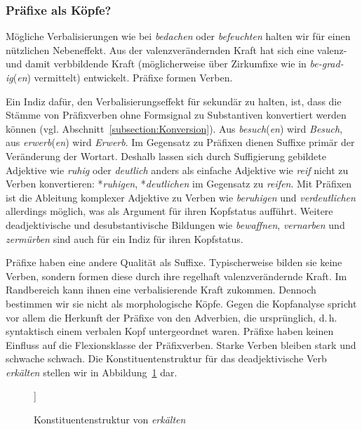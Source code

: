 \subsubsection{Präfixe als Köpfe?}\label{subsubsection:Präfix_Kopf}

Mögliche Verbalisierungen wie bei \textit{bedachen} oder \textit{befeuchten} halten wir für einen nützlichen Nebeneffekt. Aus der valenzverändernden Kraft hat sich eine valenz- und damit verbbildende Kraft (möglicherweise über Zirkumfixe wie in \textit{be-grad-ig}(\textit{en}) vermittelt) entwickelt. Präfixe formen Verben.

Ein Indiz dafür, den Verbalisierungseffekt für sekundär zu halten, ist, dass die Stämme von Präfixverben ohne Formsignal zu Substantiven konvertiert werden können (vgl. Abschnitt~\ref{subsection:Konversion}). Aus \textit{besuch}(\textit{en}) wird \textit{Besuch}, aus \textit{erwerb}(\textit{en}) wird \textit{Erwerb}. Im Gegensatz zu Präfixen dienen Suffixe primär der Veränderung der Wortart. Deshalb lassen sich durch Suffigierung gebildete Adjektive wie \textit{ruhig} oder \textit{deutlich} anders als einfache Adjektive wie \textit{reif} nicht zu Verben konvertieren: *\textit{ruhigen}, *\textit{deutlichen} im Gegensatz zu \textit{reifen}. Mit Präfixen ist die Ableitung komplexer Adjektive zu Verben wie \textit{beruhigen} und \textit{verdeutlichen} allerdings möglich, was \citet[309]{Eisenberg2020_Wort} als Argument für ihren Kopfstatus aufführt. Weitere deadjektivische und desubstantivische Bildungen wie \textit{bewaffnen}, \textit{vernarben} und \textit{zermürben} sind auch für \citet[80--84]{Olsen1985} ein Indiz für ihren Kopfstatus. 


Präfixe haben eine andere Qualität als Suffixe. Typischerweise bilden sie keine Verben, sondern formen diese durch ihre regelhaft valenzverändernde Kraft. Im Randbereich kann ihnen eine verbalisierende Kraft zukommen. Dennoch bestimmen wir sie nicht als morphologische Köpfe. Gegen die Kopfanalyse spricht vor allem die Herkunft der Präfixe von den Adverbien, die ursprünglich, d.\,h. syntaktisch einem verbalen Kopf untergeordnet waren. Präfixe haben keinen Einfluss auf die Flexionsklasse der Präfixverben. Starke Verben bleiben stark und schwache schwach. Die Konstituentenstruktur für das deadjektivische Verb \textit{erkälten} stellen wir in Abbildung~\ref{Abb:erkälten} dar.

\begin{figure}
	\centering
\begin{forest}
	[Stammform \\ Verb \\ \textit{erkält-} [Präfix\\ formt Verb\\ \textit{er-}] [Derivationsstammform\\ Adjektiv \\ \textit{kält}] ]
\end{forest}
\caption{Konstituentenstruktur von \textit{erkälten}}\label{Abb:erkälten}
\end{figure}

